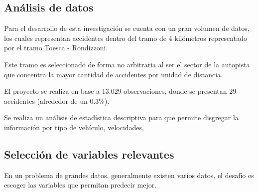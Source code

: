 \documentclass{article}
\begin{document}
\subsection{Análisis de datos}

Para el desarrollo de esta investigación se cuenta con un gran volumen de datos, los cuales representan accidentes dentro del tramo de 4 kilómetros representado por el tramo Toesca - Rondizzoni.

Este tramo es seleccionado de forma no arbitraria al ser el sector de la autopista que concentra la mayor cantidad de accidentes por unidad de distancia.

El proyecto se realiza en base a 13.029 observaciones, donde se presentan 29 accidentes (alrededor de un 0.3\%).

Se realiza un análisis de estadística descriptiva para que permite disgregar la información por tipo de vehículo, velocidades, 

\subsection{Selección de variables relevantes}

En un problema de grandes datos, generalmente existen varios datos, el desafío es escoger las variables que permitan predecir mejor.
\end{document}

